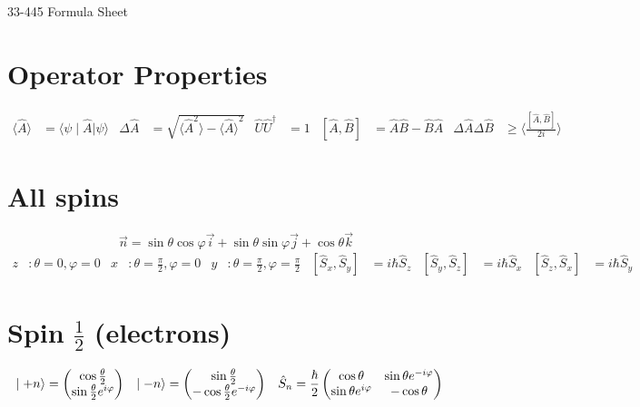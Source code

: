 \documentclass{article}
\newcommand{\bra}[1]{\ensuremath{\langle#1\mid}}
\newcommand{\ket}[1]{\ensuremath{\mid#1\rangle}}
\newcommand{\expect}[1]{\ensuremath{\langle#1\rangle}}
\newcommand{\op}[1]{\ensuremath{\hat#1}}
\newcommand{\opt}[1]{\ensuremath{\hat#1^\dagger}}
\newcommand{\mat}[1]{\ensuremath{\begin{pmatrix}\ensuremath{#1}\end{pmatrix}}}
\begin{document}
	\begin{center}
		{\LARGE{33-445 Formula Sheet}}
	\end{center}
	\section*{Operator Properties}
	\begin{align*}
		\expect{\op{A}}&=\bra{\psi}\op{A}\ket{\psi} &
		\Delta\op{A}&=\sqrt{\expect{\op{A}^2}-\expect{\op{A}}^2} &
		\op{U}\opt{U}&=1 & 
		[\op{A},\op{B}]&=\op{A}\op{B}-\op{B}\op{A} &
		\Delta\op{A}\Delta\op{B}&\ge\expect{\frac{[\op{A},\op{B}]}{2i}}
	\end{align*}
	\section*{All spins}
	\[\vec{n}=\sin\theta\cos\varphi\vec{i}+
			\sin\theta\sin\varphi\vec{j}+\cos\theta\vec{k}\]
	\begin{align*}
		z&:\theta=0,\varphi=0 & 
		x&:\theta=\frac{\pi}{2},\varphi=0 &
		y&:\theta=\frac{\pi}{2},\varphi=\frac{\pi}{2} &
		[\op{S_x},\op{S_y}]&=i\hbar\op{S_z} &
		[\op{S_y},\op{S_z}]&=i\hbar\op{S_x} &
		[\op{S_z},\op{S_x}]&=i\hbar\op{S_y}
	\end{align*}
	\section*{Spin $\frac{1}{2}$ (electrons)}
	\begin{align*}
		\ket{+n}&=\mat{\cos\frac{\theta}{2}\\
			\sin\frac{\theta}{2}e^{i\varphi}} &
		\ket{-n}&=\mat{\sin\frac{\theta}{2}\\
			-\cos\frac{\theta}{2}e^{-i\varphi}} &
		\op{S_n}&=\frac{\hbar}{2}\mat{\cos\theta&\sin\theta e^{-i\varphi}\\
			\sin\theta e^{i\varphi}&-\cos\theta} %
	\end{align*}
\end{document}
